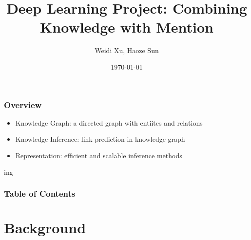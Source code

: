 \documentclass[pdf,10pt]{beamer}
\begin{document}
\title{Deep Learning Project: Combining Knowledge with Mention}
\subtitle{}
\author{Weidi Xu, Haoze Sun}
\date{\today}
\frame{\titlepage}


\begin{frame}
	\frametitle{Overview}
	\begin{itemize}
		\item Knowledge Graph: a directed graph with entiites and relations
		\item Knowledge Inference: link prediction in knowledge graph
		\item Representation: efficient and scalable inference methods
	\end{itemize}
\end{frame}ing
\begin{frame}
\frametitle{Table of Contents}
\tableofcontents
\end{frame}



\section{Background}
\end{document}
